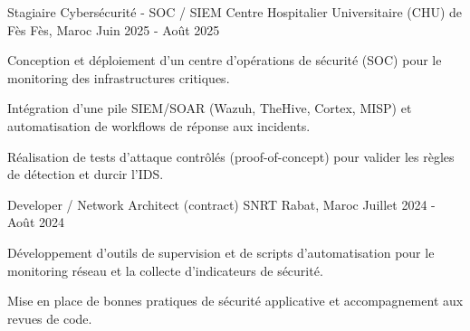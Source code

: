 
\begin{cventries}

    \cventry
    {Stagiaire Cybersécurité - SOC / SIEM} %
    {Centre Hospitalier Universitaire (CHU) de Fès} %
    {Fès, Maroc} %
    {Juin 2025 - Août 2025} %
    {
        \begin{cvitems}
            \item {Conception et déploiement d'un centre d'opérations de sécurité (SOC) pour le monitoring des infrastructures critiques.}
            \item {Intégration d'une pile SIEM/SOAR (Wazuh, TheHive, Cortex, MISP) et automatisation de workflows de réponse aux incidents.}
            \item {Réalisation de tests d'attaque contrôlés (proof-of-concept) pour valider les règles de détection et durcir l'IDS.}
        \end{cvitems}
    }


    \cventry
    {Developer / Network Architect (contract)} %
    {SNRT} %
    {Rabat, Maroc} %
    {Juillet 2024 - Août 2024} %
    {
        \begin{cvitems}
            \item {Développement d'outils de supervision et de scripts d'automatisation pour le monitoring réseau et la collecte d'indicateurs de sécurité.}
            \item {Mise en place de bonnes pratiques de sécurité applicative et accompagnement aux revues de code.}
        \end{cvitems}
    }

\end{cventries}